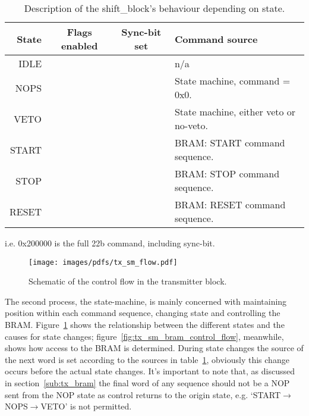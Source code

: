 \documentclass[]{article}
\newcommand{\cmark}{\ding{51}}%
\newcommand{\xmark}{\ding{55}}%
\begin{document}
    \begin{table}
        \begin{center}
            \begin{threeparttable}
                \begin{tabular}{r|c|c|l}
                    State & Flags enabled & Sync-bit set & Command source                        \\
                    \hline                                                                       
                    IDLE  &    \xmark     &    \xmark    & n/a                                   \\
                    NOPS  &    \xmark     &    \cmark    & State machine, command = 0x0\tnote{1}.\\
                    VETO  &    \xmark     &    \cmark    & State machine, either veto or no-veto.\\
                    START &    \cmark     &    \cmark    & BRAM: START command sequence.         \\
                    STOP  &    \cmark     &    \cmark    & BRAM: STOP command sequence.          \\
                    RESET &    \cmark     &    \cmark    & BRAM: RESET command sequence.         \\
                \end{tabular}
                \begin{tablenotes}
                    \scriptsize
                    \item[1] i.e. 0x200000 is the full 22b command, including sync-bit.
                \end{tablenotes}
                \caption{Description of the shift\_block's behaviour depending on state.}
            \end{threeparttable}
        \end{center}
        \label{tab:shift_block_behaviour}
    \end{table}
    
    \begin{figure}[htbp]
        \centering
            \texttt{[image: images/pdfs/tx\_sm\_flow.pdf]}
        \caption{Schematic of the control flow in the transmitter block.}
        \label{fig:tx_sm_flow}
    \end{figure}
    
    The second process, the state-machine, is mainly concerned with maintaining position within each command sequence, changing state and controlling the BRAM. Figure~\ref{fig:tx_sm_flow} shows the relationship between the different states and the causes for state changes; figure~\ref{fig:tx_sm_bram_control_flow}, meanwhile, shows how access to the BRAM is determined. During state changes the source of the next word is set according to the sources in table~\ref{tab:shift_block_behaviour}, obviously this change occurs before the actual state changes. It's important to note that, as discussed in section~\ref{sub:tx_bram} the final word of any sequence should not be a NOP sent from the NOP state as control returns to the origin state, e.g. `START\( \rightarrow \)NOPS\( \rightarrow \)VETO' is not permitted. 
    
\end{document}
